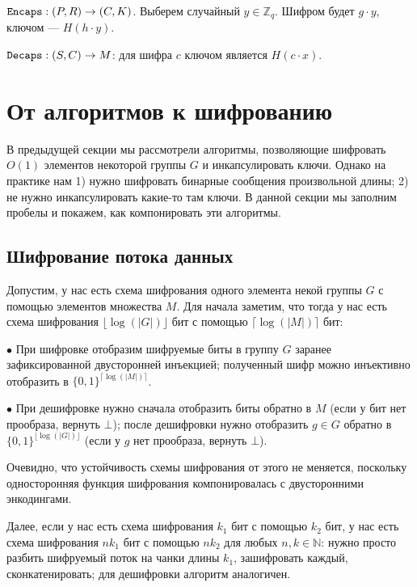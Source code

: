 \documentclass[a4paper,14pt]{extarticle}
\begin{document}
$\verb|Encaps|: (P, R) \to (C, K)$. Выберем случайный $y \in \mathbb{Z}_q$.
Шифром будет $g \cdot y$, ключом --- $H(h \cdot y)$.

$\verb|Decaps|: (S, C) \to M$: для шифра $c$ ключом является $H(c \cdot x)$.

\newpage

\section{От алгоритмов к шифрованию}

В предыдущей секции мы рассмотрели алгоритмы, позволяющие шифровать $O(1)$
элементов некоторой группы $G$ и инкапсулировать ключи. Однако на практике нам
1) нужно шифровать бинарные сообщения произвольной длины; 2) не нужно
инкапсулировать какие-то там ключи. В данной секции мы заполним пробелы и
покажем, как компонировать эти алгоритмы.

\subsection{Шифрование потока данных}
\label{stream}

Допустим, у нас есть схема шифрования одного элемента некой группы $G$ с помощью
элементов множества $M$. Для начала заметим, что тогда у нас есть схема
шифрования $\lfloor \log(|G|) \rfloor$ бит с помощью $\lceil \log(|M|) \rceil$
бит:

\vspace{0.2cm}

$\bullet$ При шифровке отобразим шифруемые биты в группу $G$ заранее
зафиксированной двусторонней инъекцией; полученный шифр можно инъективно
отобразить в $\{0, 1\}^{\lceil \log(|M|) \rceil}$.

$\bullet$ При дешифровке нужно сначала отобразить биты обратно в $M$ (если у бит
нет прообраза, вернуть $\bot$); после дешифровки нужно отобразить
$g \in G$ обратно в $\{0, 1\}^{\lfloor \log(|G|) \rfloor}$ (если у $g$
нет прообраза, вернуть $\bot$).

\vspace{0.2cm}

Очевидно, что устойчивость схемы шифрования от этого не меняется, поскольку
односторонняя функция шифрования компонировалась с двусторонними энкодингами.

Далее, если у нас есть схема шифрования $k_1$ бит с помощью $k_2$ бит, у нас
есть схема шифрования $n k_1$ бит с помощью $n k_2$ для любых
$n, k \in \mathbb{N}$: нужно просто разбить шифруемый поток на чанки длины
$k_1$, зашифровать каждый, сконкатенировать; для дешифровки алгоритм аналогичен.
\end{document}
